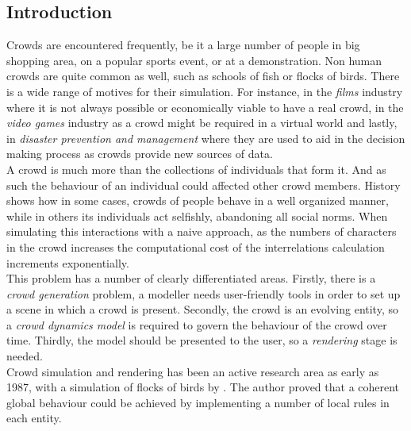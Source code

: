 \documentclass[6pt]{article} %
\begin{document}
\setcounter{page}{1} %
\columnsep 25.0pt %
\begin{multicols}{2} %

\section{Introduction}
\label{intro}

Crowds are encountered frequently, be it a large number of people in big shopping area, on a popular sports event, or at a demonstration.
Non human crowds are quite common as well, such as schools of fish or flocks of birds.
There is a wide range of motives for their simulation.
For instance, in the \textit{films} industry where it is not always possible or economically viable to have a real crowd, in the \textit{video games} industry as a crowd might be required in a virtual world and lastly, in \textit{disaster prevention and management} where they are used to aid in the decision making process as crowds provide new sources of data.\\

A crowd is much more than the collections of individuals that form it.
And as such the behaviour of an individual could affected other crowd members.
History shows how in some cases, crowds of people behave in a well organized manner, while in others its individuals act selfishly, abandoning all social norms.
When simulating this interactions with a naive approach, as the numbers of characters in the crowd increases the computational cost of the interrelations calculation increments exponentially.\\

This problem has a number of clearly differentiated areas.
Firstly, there is a \textit{crowd generation} problem, a modeller needs user-friendly tools in order to set up a scene in which a crowd is present.
Secondly, the crowd is an evolving entity, so a \textit{crowd dynamics model} is required to govern the behaviour of the crowd over time.
Thirdly, the model should be presented to the user, so a \textit{rendering} stage is needed.\\

Crowd simulation and rendering has been an active research area as early as 1987, with a simulation of flocks of birds by \cite{Reynolds1987}.
The author proved that a coherent global behaviour could be achieved by implementing a number of local rules in each entity.


\end{multicols}
\end{document}
